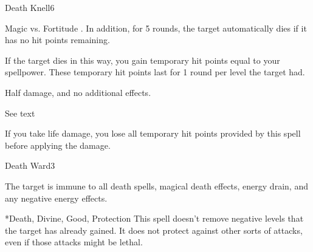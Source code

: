 \begin{spellsection}{Death Knell}{6}
    \begin{spellheader}
    \end{spellheader}
    \begin{spellcontent}
        \begin{spelltargetinginfo}
        \end{spelltargetinginfo}
        \begin{spelleffects}
            \begin{spellattack}{Magic vs. Fortitude}
                \spellsuccess {}. In addition, for 5 rounds, the target automatically dies if it has no hit points remaining.

                If the target dies in this way, you gain temporary hit points equal to your spellpower. These temporary hit points last for 1 round per level the target had.

                \spellfailure Half damage, and no additional effects.
            \end{spellattack}
            \spelldur See text
        \end{spelleffects}
    \end{spellcontent}
    \begin{spellfooter}
        \spellnotes If you take life damage, you lose all temporary hit points provided by this spell before applying the damage.
        \miscastrandom
    \end{spellfooter}
\end{spellsection}

\begin{spellsection}{Death Ward}{3}
    \begin{spellheader}
    \end{spellheader}
    \begin{spellcontent}
        \begin{spelltargetinginfo}
        \end{spelltargetinginfo}
        \begin{spelleffects}
            \spelleffect The target is immune to all death spells, magical death effects, energy drain, and any negative energy effects.
            \spelldur \durshort
        \end{spelleffects}
    \end{spellcontent}
    \begin{spellfooter}
        *{Death, Divine, Good, Protection}
        \spellnotes This spell doesn't remove negative levels that the target has already gained. It does not protect against other sorts of attacks, even if those attacks might be lethal.
        \miscastrandom
    \end{spellfooter}
\end{spellsection}


